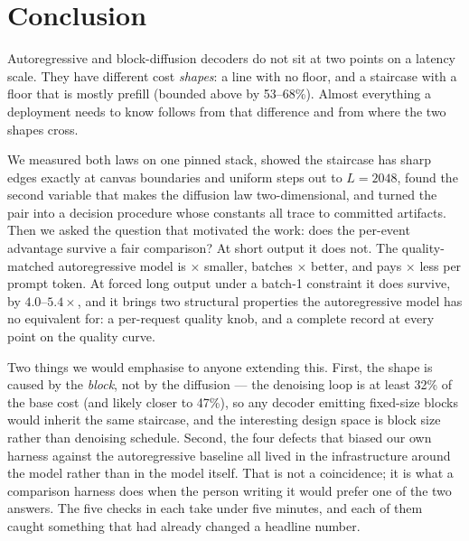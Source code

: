 \section{Conclusion}
\label{sec:conclusion}

Autoregressive and block-diffusion decoders do not sit at two points on a
latency scale. They have different cost \emph{shapes}: a line with no floor,
and a staircase with a floor that is mostly prefill (bounded above by
53--68\%). Almost everything a deployment needs to know follows from that
difference and from where the two shapes cross.

We measured both laws on one pinned stack, showed the staircase has sharp
edges exactly at canvas boundaries and uniform steps out to $L{=}2048$, found
the second variable that makes the diffusion law two-dimensional, and turned
the pair into a decision procedure whose constants all trace to committed
artifacts. Then we asked the question that motivated the work: does the
per-event advantage survive a fair comparison? At short output it does not.
The quality-matched autoregressive model is \footprintRatio$\times$ smaller,
batches \arBatchMult$\times$ better, and pays $\times$ less
per prompt token. At forced long output under a batch-1 constraint it does
survive, by $4.0$--$5.4\times$, and it brings two structural properties the
autoregressive model has no equivalent for: a per-request quality knob, and a
complete record at every point on the quality curve.

Two things we would emphasise to anyone extending this. First, the shape is
caused by the \emph{block}, not by the diffusion --- the denoising loop is at
least 32\% of the base cost (and likely closer to 47\%), so any decoder
emitting fixed-size blocks would inherit the same staircase, and the
interesting design space is block size rather than denoising schedule. Second, the four defects that biased our
own harness against the autoregressive baseline all lived in the
infrastructure around the model rather than in the model itself. That is not a
coincidence; it is what a comparison harness does when the person writing it
would prefer one of the two answers. The five checks in
 each take under five minutes, and each of them caught
something that had already changed a headline number.
